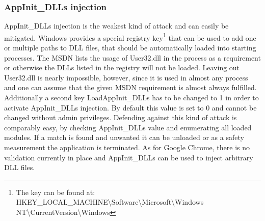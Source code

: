 \subsubsection{AppInit\_DLLs injection}
AppInit\_DLLs injection is the weakest kind of attack and can easily be mitigated. Windows provides a special registry key\footnote{The key can be found at: HKEY\_LOCAL\_MACHINE\textbackslash Software\textbackslash Microsoft\textbackslash Windows NT\textbackslash CurrentVersion\textbackslash Windows} that can be used to add one or multiple paths to DLL files, that should be automatically loaded into starting processes. The MSDN\cite{msdn_appinitdlls} lists the usage of User32.dll in the process as a requirement or otherwise the DLLs listed in the registry will not be loaded. Leaving out User32.dll is nearly impossible, however, since it is used in almost any process and one can assume that the given MSDN requirement is almost always fulfilled. Additionally a second key LoadAppInit\_DLLs has to be changed to 1 in order to activate AppInit\_DLLs injection. By default this value is set to 0 and cannot be changed without admin privileges. Defending against this kind of attack is comparably easy, by checking AppInit\_DLLs value and enumerating all loaded modules. If a match is found and unwanted it can be unloaded or as a safety measurement the application is terminated. As for Google Chrome, there is no validation currently in place and AppInit\_DLLs can be used to inject arbitrary DLL files.